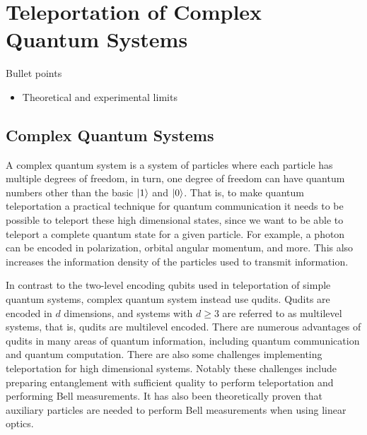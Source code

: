 \section{Teleportation of Complex Quantum Systems}
\begin{mybox}{Bullet points}
    \begin{itemize}
        \item Theoretical and experimental limits
    \end{itemize}
\end{mybox}

\subsection{Complex Quantum Systems}
A complex quantum system is a system of particles where each particle has multiple degrees of freedom, in turn, one degree of freedom can have quantum numbers other than the basic $\ket{1}$ and $\ket{0}$. That is, to make quantum teleportation a practical technique for quantum communication it needs to be possible to teleport these high dimensional states, since we want to be able to teleport a complete quantum state for a given particle. For example, a photon can be encoded in polarization, orbital angular momentum, and more. This also increases the information density of the particles used to transmit information. \cite{Hu:2023}

In contrast to the two-level encoding qubits used in teleportation of simple quantum systems, complex quantum system instead use qudits. Qudits are encoded in $d$ dimensions, and systems with $d\geq 3$ are referred to as multilevel systems, that is, qudits are multilevel encoded. There are numerous advantages of qudits in many areas of quantum information, including quantum communication and quantum computation. There are also some challenges implementing teleportation for high dimensional systems. Notably these challenges include preparing entanglement with sufficient quality to perform teleportation and performing Bell measurements. It has also been theoretically proven that auxiliary particles are needed to perform Bell measurements when using linear optics. \cite{Hu:2023}

